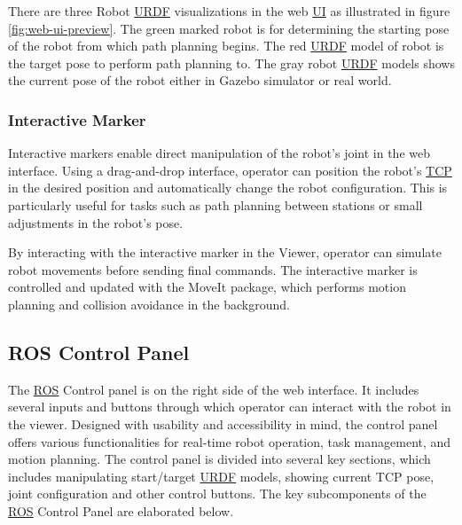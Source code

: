 There are three Robot \hyperref[acro:URDF]{URDF} visualizations in the web \hyperref[acro:UI]{UI} as illustrated in figure \ref{fig:web-ui-preview}. The green marked robot is for determining the starting pose of the robot from which path planning begins. The red \hyperref[acro:URDF]{URDF} model of robot is the target pose to perform path planning to. The gray robot \hyperref[acro:URDF]{URDF} models shows the current pose of the robot either in Gazebo simulator or real world.

\subsubsection{Interactive Marker}
\label{subsubsec:web-ui-interactive-marker}
Interactive markers enable direct manipulation of the robot's joint in the web interface. Using a drag-and-drop interface, operator can position the robot's \hyperref[acro:TCP]{TCP} in the desired position and automatically change the robot configuration. This is particularly useful for tasks such as path planning between stations or small adjustments in the robot's pose.

By interacting with the interactive marker in the Viewer, operator can simulate robot movements before sending final commands. The interactive marker is controlled and updated with the MoveIt package, which performs motion planning and collision avoidance in the background.

\subsection{ROS Control Panel}
\label{subsec:web-ui-ros-control}
The \hyperref[acro:ROS]{ROS} Control panel is on the right side of the web interface. It includes several inputs and buttons through which operator can interact with the robot in the viewer. Designed with usability and accessibility in mind, the control panel offers various functionalities for real-time robot operation, task management, and motion planning. The control panel is divided into several key sections, which includes manipulating start/target \hyperref[acro:URDF]{URDF} models, showing current TCP pose, joint configuration and other control buttons. The key subcomponents of the \hyperref[acro:ROS]{ROS} Control Panel are elaborated below.




